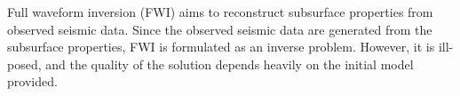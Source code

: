 %

Full waveform inversion (FWI)\cite{FWI0,FWI1} aims to reconstruct subsurface properties from observed seismic data.
Since the observed seismic data are generated from the subsurface properties, FWI is formulated as an inverse problem.
However, it is ill-posed, and the quality of the solution depends heavily on the initial model provided\cite{FWI1}.


